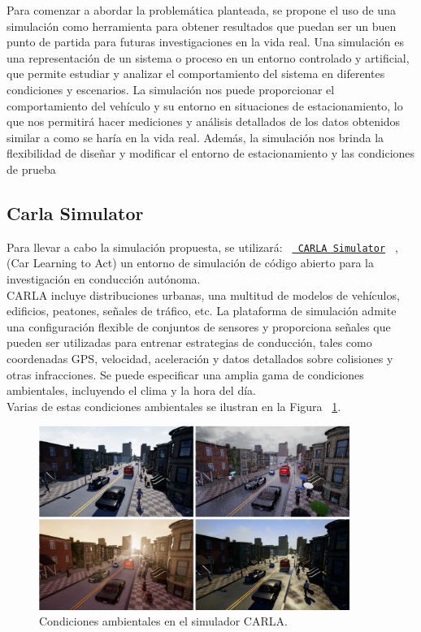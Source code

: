 
\noindent
Para comenzar a abordar la problemática planteada, se propone el uso de una simulación como herramienta para
obtener resultados que puedan ser un buen punto de partida para futuras investigaciones en la vida real.
Una simulación es una representación de un sistema o proceso en un entorno controlado y artificial,
que permite estudiar y analizar el comportamiento del sistema en diferentes condiciones y escenarios.
La simulación nos puede proporcionar el comportamiento del vehículo y su entorno en situaciones de estacionamiento,
lo que nos permitirá hacer mediciones y análisis detallados de los datos obtenidos similar a como se haría en la vida real.
Además, la simulación nos brinda la flexibilidad de diseñar y modificar el entorno de estacionamiento y las condiciones de prueba

\subsection{Carla Simulator}\label{subsec:carla-simulator}
Para llevar a cabo la simulación propuesta, se utilizará: \texttt{%
    \href{https://github.com/carla-simulator/carla}{%
        CARLA Simulator}%
}
, (Car Learning to Act) un entorno de simulación de código abierto para la investigación en conducción autónoma.\\
CARLA incluye distribuciones urbanas, una multitud de modelos de vehículos, edificios, peatones, señales de tráfico, etc.
La plataforma de simulación admite una configuración flexible de conjuntos de sensores y proporciona señales
que pueden ser utilizadas para entrenar estrategias de conducción, tales como coordenadas GPS, velocidad, aceleración
y datos detallados sobre colisiones y otras infracciones.
Se puede especificar una amplia gama de condiciones ambientales, incluyendo el clima y la hora del día.~\cite{dosovitskiy2017carla}\\
Varias de estas condiciones ambientales se ilustran en la Figura ~\ref{fig:carla-simulator}.
\begin{figure}[!ht]
    \centering
    \includegraphics[width=0.9\textwidth]{img/carla_clima_example}
    \caption{Condiciones ambientales en el simulador CARLA.}
    \label{fig:carla-simulator}
\end{figure}

